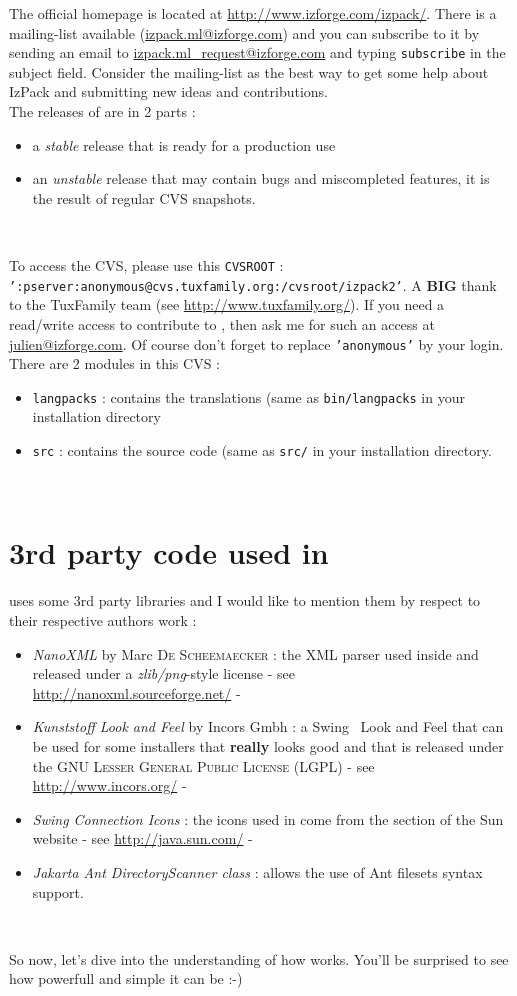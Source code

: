 The official \IzPack homepage is located at
\mbox{\url{http://www.izforge.com/izpack/}}. There is a mailing-list available 
(\url{izpack.ml@izforge.com}) and you can subscribe to it by sending an email to
\url{izpack.ml_request@izforge.com} and typing \texttt{subscribe} in the 
subject field. Consider the mailing-list as the best way to get some help about
IzPack and submitting new ideas and contributions.\\

The releases of \IzPack are in 2 parts :
\begin{itemize}
	\item a \textit{stable} release that is ready for a production use
	\item an \textit{unstable} release that may contain bugs and miscompleted
	features, it is the result of regular CVS snapshots.
\end{itemize}\

To access the CVS, please use this \texttt{CVSROOT} :\\
\texttt{':pserver:anonymous@cvs.tuxfamily.org:/cvsroot/izpack2'}. A \textbf{BIG}
thank to the TuxFamily team (see \url{http://www.tuxfamily.org/}). If you need a
read/write access to contribute to \IzPack, then ask me for such an access at
\url{julien@izforge.com}. Of course don't forget to replace \texttt{'anonymous'}
by your login. There are 2 modules in this CVS :
\begin{itemize}
	\item \texttt{langpacks} : contains the translations (same as
	\texttt{bin/langpacks} in your \IzPack installation directory
	\item \texttt{src} : contains the source code (same as \texttt{src/} in your
	\IzPack installation directory.
\end{itemize}\

\section*{3rd party code used in \IzPack}

\IzPack uses some 3rd party libraries and I would like to mention them by
respect to their respective authors work :
\begin{itemize}
	\item \textit{NanoXML} by Marc \textsc{De Scheemaecker} : the XML parser used
	inside \IzPack and released under a \textit{zlib/png}-style license - see\\
	\url{http://nanoxml.sourceforge.net/} -
	\item \textit{Kunststoff Look and Feel} by Incors Gmbh : a Swing\texttrademark 
	\ Look and Feel
	that can be used for some installers that \textbf{really} looks good and that 
	is released under the \textsc{GNU Lesser General Public License (LGPL)} - see
	\url{http://www.incors.org/} -
	\item \textit{Swing Connection Icons} : the icons used in \IzPack come from
	the \Java section of the Sun website - see \url{http://java.sun.com/} -
	\item \textit{Jakarta Ant DirectoryScanner class} : allows the use of Ant
	filesets syntax support. 
\end{itemize}\

So now, let's dive into the understanding of how \IzPack works. You'll be
surprised to see how powerfull and simple it can be :-)
